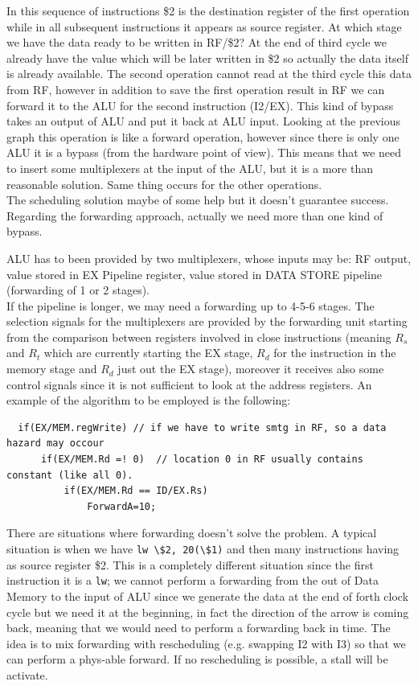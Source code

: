   In this sequence of instructions \$2 is the destination register of the first operation while in all subsequent instructions it appears as source register. At which stage we have the data ready to be written in RF/\$2? At the end of third cycle we already have the value which will be later written in \$2 so actually the data itself is already available. The second operation cannot read at the third cycle this data from RF, however in addition to save the first operation result in RF we can forward it to the ALU for the second instruction (I2/EX). This kind of bypass takes an output of ALU and put it back at ALU input. Looking at the previous graph this operation is like a forward operation, however since there is only one ALU it is a bypass (from the hardware point of view). This means that we need to insert some multiplexers at the input of the ALU, but it is a more than reasonable solution. Same thing occurs for the other operations. \\

  The scheduling solution maybe of some help but it doesn't guarantee success. Regarding the forwarding approach, actually we need more than one kind of bypass.

  ALU has to been provided by two multiplexers, whose inputs may be: RF output, value stored in EX Pipeline register, value stored in DATA STORE pipeline (forwarding of 1 or 2 stages).\\

  If the pipeline is longer, we may need a forwarding up to 4-5-6 stages. The selection signals for the multiplexers are provided by the forwarding unit starting from the comparison between registers involved in close instructions (meaning $R_s$ and $R_t$ which are currently starting the EX stage, $R_d$ for the instruction in the memory stage and $R_d$ just out the EX stage), moreover it receives also some control signals since it is not sufficient to look at the address registers. An example of the algorithm to be employed is the following:

  \begin{verbatim}
  if(EX/MEM.regWrite) // if we have to write smtg in RF, so a data hazard may occour
      if(EX/MEM.Rd =! 0)  // location 0 in RF usually contains constant (like all 0).
          if(EX/MEM.Rd == ID/EX.Rs)
              ForwardA=10;
  \end{verbatim}

  There are situations where forwarding doesn't solve the problem. A typical situation is when we have \verb|lw \$2, 20(\$1)| and then many instructions having as source register \$2. This is a completely different situation since the first instruction it is a \verb|lw|; we cannot perform a forwarding from the out of Data Memory to the input of ALU since we generate the data at the end of forth clock cycle but we need it at the beginning, in fact the direction of the arrow is coming back, meaning that we would need to perform a forwarding back in time. The idea is to mix forwarding with rescheduling (e.g. swapping I2 with I3) so that we can perform a phys-able forward. If no rescheduling is possible, a stall will be activate. \\

